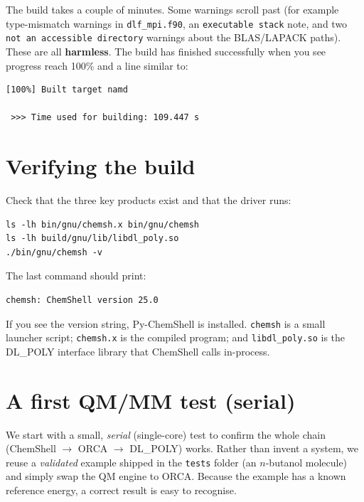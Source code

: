 \documentclass[12pt,a4paper]{article}
\begin{document}
\phantom{i} %

The build takes a couple of minutes. Some warnings scroll past (for example
type-mismatch warnings in \texttt{dlf\_mpi.f90}, an \texttt{executable stack} note,
and two \texttt{not an ac\-ces\-si\-ble directory} warnings about the BLAS/LAPACK paths).
These are all \textbf{harmless}. The build has finished successfully when you see
progress reach 100\% and a line similar to:

\begin{lstlisting}[style=output]
[100%] Built target namd

 >>> Time used for building: 109.447 s
\end{lstlisting}

\section{Verifying the build}
\setcounter{subsection}{-1}

Check that the three key products exist and that the driver runs:

\begin{lstlisting}[style=shell]
ls -lh bin/gnu/chemsh.x bin/gnu/chemsh
ls -lh build/gnu/lib/libdl_poly.so
./bin/gnu/chemsh -v
\end{lstlisting}

The last command should print:

\begin{lstlisting}[style=output]
chemsh: ChemShell version 25.0
\end{lstlisting}

If you see the version string, Py-ChemShell is installed. \texttt{chemsh} is a
small launcher script; \texttt{chemsh.x} is the compiled program; and
\texttt{libdl\_poly.so} is the DL\_POLY interface library that ChemShell calls
in-process.

\section{A first QM/MM test (serial)}
\label{sec:serial}
\setcounter{subsection}{-1}

We start with a small, \emph{serial} (single-core) test to confirm the whole
chain (ChemShell $\rightarrow$ ORCA $\rightarrow$ DL\_POLY) works. Rather
than invent a system, we reuse a \emph{validated} example shipped in the
\texttt{tests} folder (an $n$-butanol molecule) and simply swap the QM engine
to ORCA. Because the example has a known reference energy, a correct result is
easy to recognise.
\end{document}
